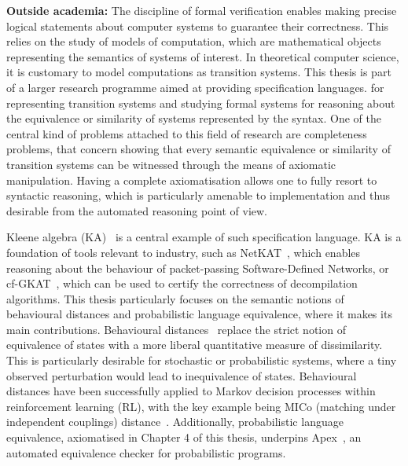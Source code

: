 \begin{impactstatement}
\textbf{Outside academia:} The discipline of formal verification enables making precise logical statements about computer systems to guarantee their correctness. This relies on the study of models of computation, which are mathematical objects representing the semantics of systems of interest. In theoretical computer science, it is customary to model computations as transition systems. This thesis is part of a larger research programme aimed at providing specification languages. for representing transition systems and studying formal systems for reasoning about the equivalence or similarity of systems represented by the syntax. One of the central kind of problems attached to this field of research are completeness problems, that concern showing that every semantic equivalence or similarity of transition systems can be witnessed through the means of axiomatic manipulation. Having a complete axiomatisation allows one to fully resort to syntactic reasoning, which is particularly amenable to implementation and thus desirable from the automated reasoning point of view. 

Kleene algebra (KA)~\cite{Kozen:1994:Completeness} is a central example of such specification language. KA is a foundation of tools relevant to industry, such as NetKAT~\cite{Anderson:2014:NetKAT}, which enables reasoning about the behaviour of packet-passing Software-Defined Networks, or cf-GKAT~\cite{Zhang:2025:CFGKAT}, which can be used to certify the correctness of decompilation algorithms. This thesis particularly focuses on the semantic notions of behavioural distances and probabilistic language equivalence, where it makes its main contributions. Behavioural distances~\cite{Breugel:2001:Towards,Desharnais:2004:Metrics} replace the strict notion of equivalence of states with a more liberal quantitative measure of dissimilarity. This is particularly desirable for stochastic or probabilistic systems, where a tiny observed perturbation would lead to inequivalence of states. Behavioural distances have been successfully applied to Markov decision processes within reinforcement learning (RL), with the key example being MICo (matching under independent couplings) distance~\cite{Castro:2021:MICo}. Additionally, probabilistic language equivalence, axiomatised in Chapter 4 of this thesis, underpins Apex~\cite{Kiefer:2012:APEX}, an automated equivalence checker for probabilistic programs.


\end{impactstatement}
